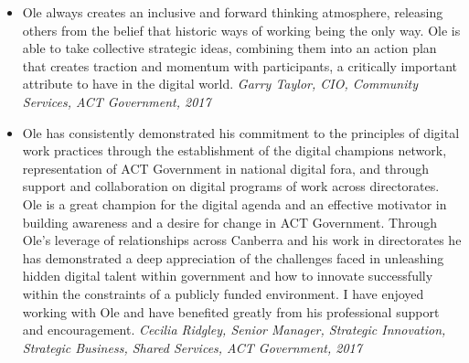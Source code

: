 \documentclass[11pt,a4paper]{article}
\begin{document}
\begin{itemize}
\item Ole always creates an inclusive and forward thinking atmosphere, releasing others from the belief that historic ways of working being the only way. Ole is able to take collective strategic ideas, combining them into an action plan that creates traction and momentum with participants, a critically important attribute to have in the digital world.
\emph{Garry Taylor, CIO, Community Services, ACT Government, 2017}

\item Ole has consistently demonstrated his commitment to the principles of digital work practices through the establishment of the digital champions network, representation of ACT Government in national digital fora, and through support and collaboration on digital programs of work across directorates. Ole is a great champion for the digital agenda and an effective motivator in building awareness and a desire for change in ACT Government.
Through Ole’s leverage of relationships across Canberra and his work in directorates he has demonstrated a deep appreciation of the challenges faced in unleashing hidden digital talent within government and how to innovate successfully within the constraints of a publicly funded environment. 
I have enjoyed working with Ole and have benefited greatly from his professional support and encouragement.
\emph{Cecilia Ridgley, Senior Manager, Strategic Innovation, Strategic Business, Shared Services, ACT Government, 2017}
  

\end{itemize}
\end{document}
